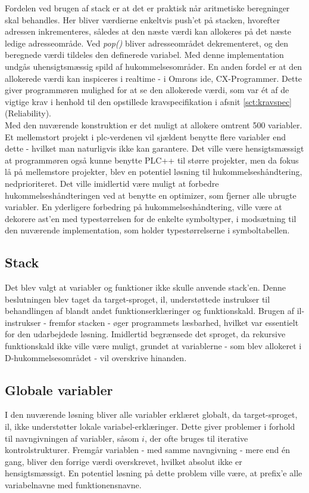 \noindent Fordelen ved brugen af stack er at det er praktisk når aritmetiske beregninger skal behandles. Her bliver værdierne enkeltvis push'et på stacken, hvorefter adressen inkrementeres, således at den næste værdi kan allokeres på det næste ledige adresseområde. Ved \textit{pop()} bliver adresseområdet dekrementeret, og den beregnede værdi tildeles den definerede variabel. Med denne implementation undgås uhensigtsmæssig spild af hukommelsesområder.
En anden fordel er at den allokerede værdi kan inspiceres i realtime - i Omrons \gls{ide}, CX-Programmer. Dette giver programmøren mulighed for at se den allokerede værdi, som var ét af de vigtige krav i henhold til den opstillede kravspecifikation i afsnit \ref{sct:kravspec} (Reliability). \\

\noindent Med den nuværende konstruktion er det muligt at allokere omtrent 500 variabler. Et mellemstort projekt i \gls{plc}-verdenen vil sjældent benytte flere variabler end dette - hvilket man naturligvis ikke kan garantere. Det ville være hensigtsmæssigt at programmøren også kunne benytte PLC++ til større projekter, men da fokus lå på mellemstore projekter, blev en potentiel løsning til hukommelseshåndtering, nedprioriteret.  
Det ville imidlertid være muligt at forbedre hukommelseshåndteringen ved at benytte en optimizer, som fjerner alle ubrugte variabler.   
En yderligere forbedring på hukommelseshåndtering, ville være at dekorere \gls{ast}'en med typestørrelsen for de enkelte symboltyper, i modsætning til den nuværende implementation, som holder typestørrelserne i symboltabellen.

\subsection*{Stack}
\noindent Det blev valgt at variabler og funktioner ikke skulle anvende stack'en. Denne beslutningen blev taget da target-sproget, \gls{il}, understøttede instrukser til behandlingen af blandt andet funktionserklæringer og funktionskald. Brugen af \gls{il}-instrukser - fremfor stacken - øger programmets læsbarhed, hvilket var essentielt for den udarbejdede løsning. Imidlertid begrænsede det sproget, da rekursive funktionskald ikke ville være muligt, grundet at variablerne - som blev allokeret i D-hukommelsesområdet - vil overskrive hinanden.

\subsection*{Globale variabler}
I den nuværende løsning bliver alle variabler erklæret globalt, da target-sproget, \gls{il}, ikke understøtter lokale variabel-erklæringer. Dette giver problemer i forhold til navngivningen af variabler, såsom $i$, der ofte bruges til iterative kontrolstrukturer. Fremgår variablen - med samme navngivning - mere end én gang, bliver den forrige værdi overskrevet, hvilket absolut ikke er hensigtsmæssigt. 
En potentiel løsning på dette problem ville være, at prefix'e alle variabelnavne med funktionensnavne.










